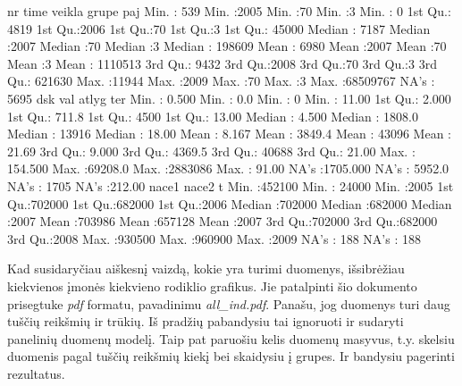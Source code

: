 \documentclass[a4paper]{article}
\begin{document}
\begin{Schunk}
\begin{Soutput}
       nr             time          veikla       grupe        paj          
 Min.   :  539   Min.   :2005   Min.   :70   Min.   :3   Min.   :       0  
 1st Qu.: 4819   1st Qu.:2006   1st Qu.:70   1st Qu.:3   1st Qu.:   45000  
 Median : 7187   Median :2007   Median :70   Median :3   Median :  198609  
 Mean   : 6980   Mean   :2007   Mean   :70   Mean   :3   Mean   : 1110513  
 3rd Qu.: 9432   3rd Qu.:2008   3rd Qu.:70   3rd Qu.:3   3rd Qu.:  621630  
 Max.   :11944   Max.   :2009   Max.   :70   Max.   :3   Max.   :68509767  
                                                         NA's   :    5695  
      dsk                val              atlyg              ter        
 Min.   :   0.500   Min.   :    0.0   Min.   :      0   Min.   : 11.00  
 1st Qu.:   2.000   1st Qu.:  711.8   1st Qu.:   4500   1st Qu.: 13.00  
 Median :   4.500   Median : 1808.0   Median :  13916   Median : 18.00  
 Mean   :   8.167   Mean   : 3849.4   Mean   :  43096   Mean   : 21.69  
 3rd Qu.:   9.000   3rd Qu.: 4369.5   3rd Qu.:  40688   3rd Qu.: 21.00  
 Max.   : 154.500   Max.   :69208.0   Max.   :2883086   Max.   : 91.00  
 NA's   :1705.000   NA's   : 5952.0   NA's   :   1705   NA's   :212.00  
     nace1            nace2              t       
 Min.   :452100   Min.   : 24000   Min.   :2005  
 1st Qu.:702000   1st Qu.:682000   1st Qu.:2006  
 Median :702000   Median :682000   Median :2007  
 Mean   :703986   Mean   :657128   Mean   :2007  
 3rd Qu.:702000   3rd Qu.:682000   3rd Qu.:2008  
 Max.   :930500   Max.   :960900   Max.   :2009  
 NA's   :   188   NA's   :   188                 
\end{Soutput}
\end{Schunk}
Kad susidaryčiau aiškesnį vaizdą, kokie yra turimi duomenys,
išsibrėžiau kiekvienos įmonės kiekvieno rodiklio grafikus. Jie
patalpinti šio dokumento prisegtuke \emph{pdf} formatu, pavadinimu
\emph{all\_ind.pdf}. Panašu, jog duomenys turi daug tuščių reikšmių ir
trūkių. Iš pradžių pabandysiu tai ignoruoti ir sudaryti panelinių
duomenų modelį. Taip pat paruošiu kelis duomenų masyvus, t.y. skelsiu
duomenis pagal tuščių reikšmių kiekį bei skaidysiu į grupes. Ir
bandysiu pagerinti rezultatus.
\end{document}
